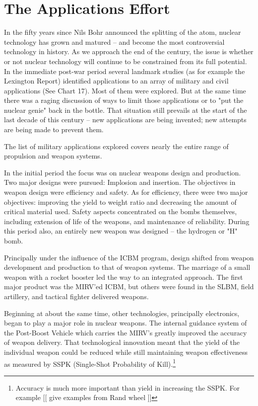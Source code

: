 \section{The Applications Effort}
In the fifty years since Nils Bohr announced the splitting of the atom, nuclear technology has grown and matured -- and become the most controversial technology in history. As we approach the end of the century, the issue is whether or not nuclear technology will continue to be constrained from its full potential. In the immediate post-war period several landmark studies (as for example the Lexington Report) identified applications to an array of military and civil applications (See Chart 17). Most of them were explored. But at the same time there was a raging discussion of ways to limit those applications or to "put the nuclear genie" back in the bottle. That situation still prevails at the start of the last decade of this century -- new applications are being invented; new attempts are being made to prevent them.

The list of military applications explored covers nearly the entire range of propulsion and weapon systems.

In the initial period the focus was on nuclear weapons design and production. Two major designs were pursued: Implosion and insertion. The objectives in weapon design were efficiency and safety. As for efficiency, there were two major objectives: improving the yield to weight ratio and decreasing the amount of critical material used. Safety aspects concentrated on the bombs themselves, including extension of life of the weapons, and maintenance of reliability. During this period also, an entirely new weapon was designed -- the hydrogen or "H" bomb.

Principally under the influence of the ICBM program, design shifted from weapon development and production to that of weapon systems. The marriage of a small weapon with a rocket booster led the way to an integrated approach. The first major product was the MIRV'ed ICBM, but others were found in the SLBM, field artillery, and tactical fighter delivered weapons.

Beginning at about the same time, other technologies, principally electronics, began to play a major role in nuclear weapons. The internal guidance system of the Post-Boost Vehicle which carries the MIRV's greatly improved the accuracy of weapon delivery. That technological innovation meant that the yield of the individual weapon could be reduced while still maintaining weapon effectiveness as measured by SSPK (Single-Shot Probability of Kill).\footnote{
Accuracy is much more important than yield in increasing the SSPK. For example [[ give examples from Rand wheel ]]} 

